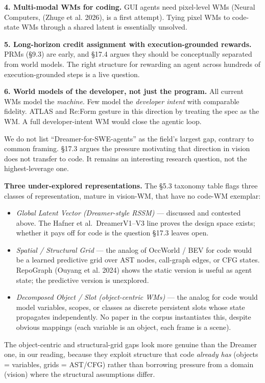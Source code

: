 \documentclass{article}
\providecommand{\tightlist}{\setlength{\itemsep}{0pt}\setlength{\parskip}{0pt}}
\begin{document}
\textbf{4. Multi-modal WMs for coding.} GUI agents need pixel-level WMs
(Neural Computers, (Zhuge et al. 2026), is a first attempt). Tying pixel
WMs to code-state WMs through a shared latent is essentially unsolved.

\textbf{5. Long-horizon credit assignment with execution-grounded
rewards.} PRMs (§9.3) are early, and §17.4 argues they should be
conceptually separated from world models. The right structure for
rewarding an agent across hundreds of execution-grounded steps is a live
question.

\textbf{6. World models of the developer, not just the program.} All
current WMs model the \emph{machine}. Few model the \emph{developer
intent} with comparable fidelity. ATLAS and Re:Form gesture in this
direction by treating the spec as the WM. A full developer-intent WM
would close the agentic loop.

We do not list ``Dreamer-for-SWE-agents'' as the field's largest gap,
contrary to common framing. §17.3 argues the pressure motivating that
direction in vision does not transfer to code. It remains an interesting
research question, not the highest-leverage one.

\textbf{Three under-explored representations.} The §5.3 taxonomy table
flags three classes of representation, mature in vision-WM, that have no
code-WM exemplar:

\begin{itemize}
\tightlist
\item
  \emph{Global Latent Vector (Dreamer-style RSSM)} --- discussed and
  contested above. The Hafner et al.~DreamerV1--V3 line proves the
  design space exists; whether it pays off for code is the question
  §17.3 leaves open.
\item
  \emph{Spatial / Structural Grid} --- the analog of OccWorld / BEV for
  code would be a learned predictive grid over AST nodes, call-graph
  edges, or CFG states. RepoGraph (Ouyang et al. 2024) shows the static
  version is useful as agent state; the predictive version is
  unexplored.
\item
  \emph{Decomposed Object / Slot (object-centric WMs)} --- the analog
  for code would model variables, scopes, or classes as discrete
  persistent slots whose state propagates independently. No paper in the
  corpus instantiates this, despite obvious mappings (each variable is
  an object, each frame is a scene).
\end{itemize}

The object-centric and structural-grid gaps look more genuine than the
Dreamer one, in our reading, because they exploit structure that code
\emph{already has} (objects = variables, grids = AST/CFG) rather than
borrowing pressure from a domain (vision) where the structural
assumptions differ.
\end{document}
